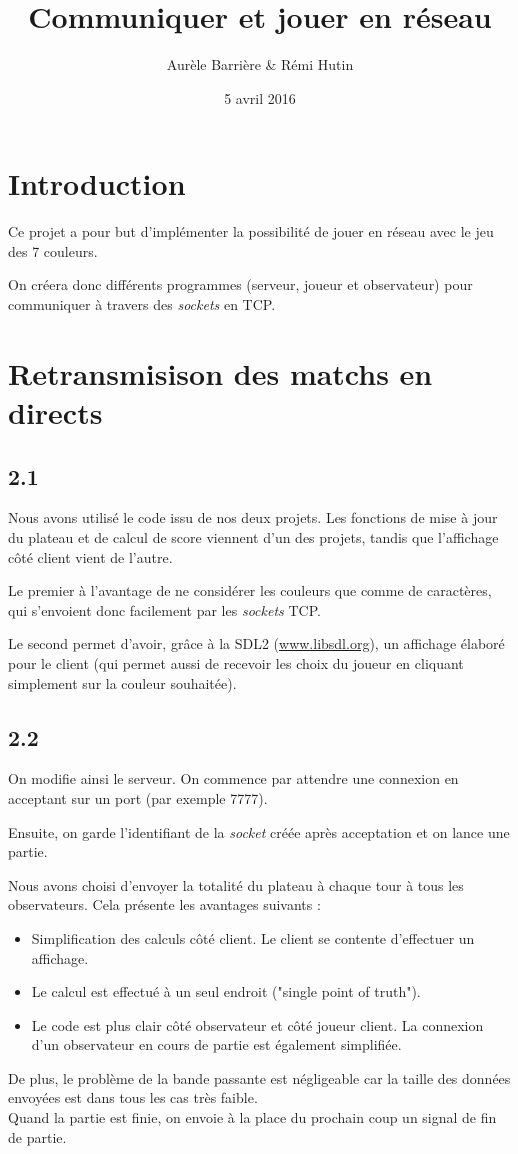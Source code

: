 \documentclass[12pt]{article}
\title{Communiquer et jouer en réseau}
\author{Aurèle Barrière \& Rémi Hutin}
\date{5 avril 2016}
\def\question#1{\subsection{#1}}
\def\sec#1{\section{#1}}
\begin{document}
\maketitle
\tableofcontents

\sec{Introduction}

Ce projet a pour but d'implémenter la possibilité de jouer en réseau avec le jeu des 7 couleurs.

On créera donc différents programmes (serveur, joueur et observateur) pour communiquer à travers des \textit{sockets} en TCP.


\sec{Retransmisison des matchs en directs}
\question{2.1}
Nous avons utilisé le code issu de nos deux projets. Les fonctions de mise à jour du plateau et de calcul de score viennent d'un des projets, tandis que l'affichage côté client vient de l'autre.

Le premier à l'avantage de ne considérer les couleurs que comme de caractères, qui s'envoient donc facilement par les \textit{sockets} TCP.

Le second permet d'avoir, grâce à la SDL2 (\url{www.libsdl.org}), un affichage élaboré pour le client (qui permet aussi de recevoir les choix du joueur en cliquant simplement sur la couleur souhaitée).


\question{2.2}
On modifie ainsi le serveur. On commence par attendre une connexion en acceptant sur un port (par exemple 7777).

Ensuite, on garde l'identifiant de la \textit{socket} créée après acceptation et on lance une partie.

Nous avons choisi d'envoyer la totalité du plateau à chaque tour à tous les observateurs. Cela présente les avantages suivants :
\begin{itemize}
\item Simplification des calculs côté client. Le client se contente d'effectuer un affichage.
\item Le calcul est effectué à un seul endroit ("single point of truth").
\item Le code est plus clair côté observateur et côté joueur client. La connexion d'un observateur en cours de partie est également simplifiée.
\end{itemize}
De plus, le problème de la bande passante est négligeable car la taille des données envoyées est dans tous les cas très faible. \\

Quand la partie est finie, on envoie à la place du prochain coup un signal de fin de partie.
\end{document}
